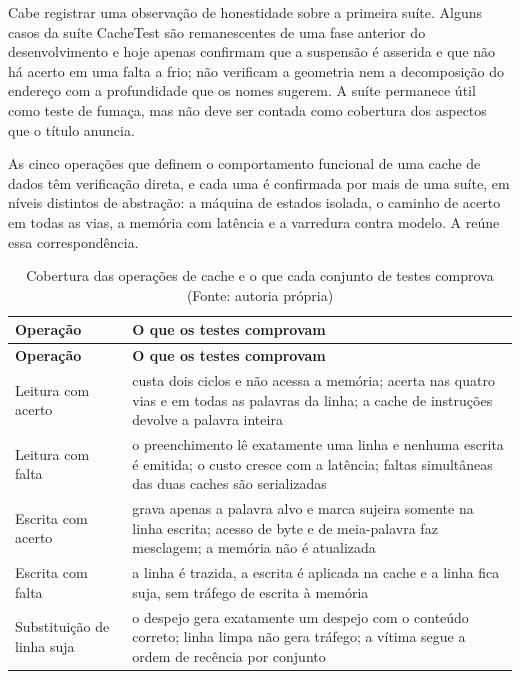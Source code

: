 Cabe registrar uma observação de honestidade sobre a primeira suíte. Alguns casos da suíte CacheTest são remanescentes de uma fase anterior do desenvolvimento e hoje apenas confirmam que a suspensão é asserida e que não há acerto em uma falta a frio; não verificam a geometria nem a decomposição do endereço com a profundidade que os nomes sugerem. A suíte permanece útil como teste de fumaça, mas não deve ser contada como cobertura dos aspectos que o título anuncia.

As cinco operações que definem o comportamento funcional de uma cache de dados têm verificação direta, e cada uma é confirmada por mais de uma suíte, em níveis distintos de abstração: a máquina de estados isolada, o caminho de acerto em todas as vias, a memória com latência e a varredura contra modelo. A  reúne essa correspondência.

{\small
\begin{longtable}{@{}>{\raggedright\arraybackslash}p{}>{\raggedright\arraybackslash}p{}@{}}
\caption[Cobertura das operações de cache e o que cada conjunto de testes comprova]{Cobertura das operações de cache e o que cada conjunto de testes comprova (Fonte: autoria própria)}\label{tab:6.2}\\
\hline
\textbf{Operação} & \textbf{O que os testes comprovam} \\
\hline
\endfirsthead
\hline
\textbf{Operação} & \textbf{O que os testes comprovam} \\
\hline
\endhead
\hline
\endlastfoot
Leitura com acerto & custa dois ciclos e não acessa a memória; acerta nas quatro vias e em todas as palavras da linha; a cache de instruções devolve a palavra inteira \\
Leitura com falta & o preenchimento lê exatamente uma linha e nenhuma escrita é emitida; o custo cresce com a latência; faltas simultâneas das duas caches são serializadas \\
Escrita com acerto & grava apenas a palavra alvo e marca sujeira somente na linha escrita; acesso de byte e de meia-palavra faz mesclagem; a memória não é atualizada \\
Escrita com falta & a linha é trazida, a escrita é aplicada na cache e a linha fica suja, sem tráfego de escrita à memória \\
Substituição de linha suja & o despejo gera exatamente um despejo com o conteúdo correto; linha limpa não gera tráfego; a vítima segue a ordem de recência por conjunto \\
\end{longtable}
}

